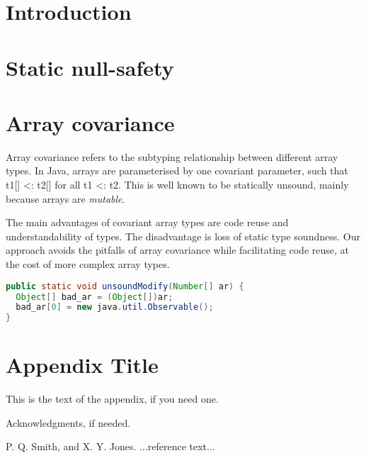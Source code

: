 \documentclass[preprint]{sigplanconf}
\begin{document}

\terms

\keywords

\section{Introduction}

\section{Static null-safety}

\section{Array covariance}

Array covariance refers to the subtyping relationship between different array types.
In Java, arrays are parameterised by one covariant parameter, such that
t1[] <: t2[] for all t1 <: t2. This is well known to be statically unsound,
mainly because arrays are \emph{mutable}. 

The main advantages of covariant array types are code reuse
and understandability of types.
The disadvantage is loss of static type soundness.
Our approach avoids the pitfalls of array covariance
while facilitating code reuse, at the cost of more complex array types.


\begin{lstlisting}[language=java]
public static void unsoundModify(Number[] ar) {
  Object[] bad_ar = (Object[])ar;
  bad_ar[0] = new java.util.Observable();
}
\end{lstlisting}


\appendix
\section{Appendix Title}

This is the text of the appendix, if you need one.

\acks

Acknowledgments, if needed.





\begin{thebibliography}{}
\softraggedright

P. Q. Smith, and X. Y. Jones. ...reference text...

\end{thebibliography}
\end{document}
